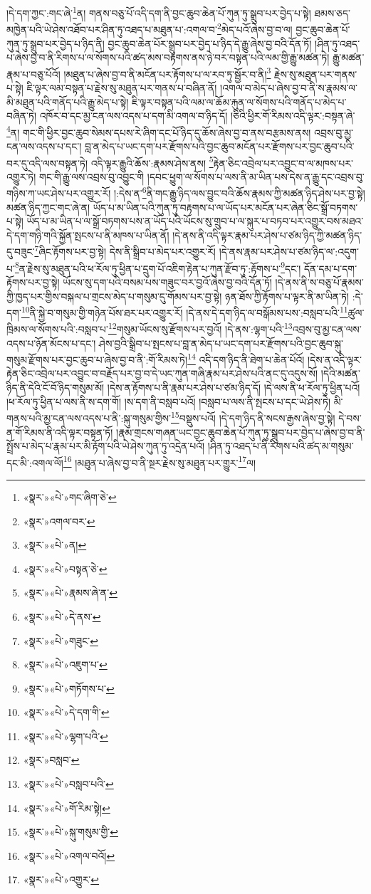 །དེ་དག་ཀྱང་:གང་ཞེ་\footnote{«སྣར་»«པེ་»གང་ཞིག་ཅེ་}ན། གནས་བཅུ་པོ་འདི་དག་ནི་བྱང་ཆུབ་ཆེན་པོ་ཀུན་ཏུ་སྒྲུབ་པར་བྱེད་པ་སྟེ། ཐམས་ཅད་མཁྱེན་པའི་ཡེ་ཤེས་འཐོབ་པར་ཤིན་ཏུ་འཐད་པ་མཐུན་པ་:འགལ་བ་\footnote{«སྣར་»འགལ་བར་}མེད་པའོ་ཞེས་བྱ་བ་ལ། བྱང་ཆུབ་ཆེན་པོ་ཀུན་ཏུ་སྒྲུབ་པར་བྱེད་པ་ཉིད་ནི། བྱང་ཆུབ་ཆེན་པོར་སྒྲུབ་པར་བྱེད་པ་ཉིད་དེ་རྒྱུ་ཞེས་བྱ་བའི་དོན་ཏོ། །ཤིན་ཏུ་འཐད་པ་ཞེས་བྱ་བ་ནི་རིགས་པ་ལ་སོགས་པའི་ཚད་མས་བརྟགས་ནས་ཉེ་བར་བསྟན་པའི་ལམ་གྱི་རྒྱུ་མཚན་ཏེ། རྒྱུ་མཚན་རྣམ་པ་བཅུ་པོའོ། །མཐུན་པ་ཞེས་བྱ་བ་ནི་མངོན་པར་རྟོགས་པ་ལ་རབ་ཏུ་སྦྱོར་བ་ནི།\footnote{«སྣར་»«པེ་»ན།} རྗེས་སུ་མཐུན་པར་གནས་པ་སྟེ། ཇི་ལྟར་ལམ་བསྟན་པ་རྗེས་སུ་མཐུན་པར་གནས་པ་བཞིན་ནོ། །འགལ་བ་མེད་པ་ཞེས་བྱ་བ་ནི་ས་རྣམས་ལ་མི་མཐུན་པའི་གནོད་པའི་རྒྱུ་མེད་པ་སྟེ། ཇི་ལྟར་བསྟན་པའི་ལམ་ལ་ཆོམ་རྐུན་ལ་སོགས་པའི་གནོད་པ་མེད་པ་བཞིན་ཏེ། འཁོར་བ་དང་མྱ་ངན་ལས་འདས་པ་དག་མི་འགལ་བ་ཉིད་དོ། །ཅིའི་ཕྱིར་གོ་རིམས་འདི་ལྟར་:བསྟན་ཞེ་\footnote{«སྣར་»«པེ་»བསྟན་ཅེ་}ན། གང་གི་ཕྱིར་བྱང་ཆུབ་སེམས་དཔས་རེ་ཞིག་དང་པོ་ཉིད་དུ་ཆོས་ཞེས་བྱ་བ་ནས་བརྩམས་ནས། འབྲས་བུ་མྱ་ངན་ལས་འདས་པ་དང་། བླ་ན་མེད་པ་ཡང་དག་པར་རྫོགས་པའི་བྱང་ཆུབ་མངོན་པར་རྫོགས་པར་བྱང་ཆུབ་པའི་བར་དུ་འདི་ལས་བསྟན་ཏེ། འདི་ལྟར་རྒྱུའི་ཆོས་:རྣམས་ཤེས་ནས། \footnote{«སྣར་»«པེ་»རྣམས་ཞེ་ན་}རྟེན་ཅིང་འབྲེལ་པར་འབྱུང་བ་ལ་མཁས་པར་འགྱུར་ཏེ། གང་གི་རྒྱུ་ལས་འབྲས་བུ་འབྱུང་གི །དབང་ཕྱུག་ལ་སོགས་པ་ལས་ནི་མ་ཡིན་པས་དེས་ན་རྒྱུ་དང་འབྲས་བུ་གཉིས་ཀ་ཡང་ཤེས་པར་འགྱུར་རོ། །:དེས་ན་\footnote{«སྣར་»«པེ་»དེ་ནས་}ནི་གང་རྒྱུ་ཉིད་ལས་བྱུང་བའི་ཆོས་རྣམས་ཀྱི་མཚན་ཉིད་ཤེས་པར་བྱ་སྟེ། མཚན་ཉིད་ཀྱང་གང་ཞེ་ན། ཡོད་པ་མ་ཡིན་པའི་ཀུན་ཏུ་བརྟགས་པ་ལ་ཡོད་པར་མངོན་པར་ཞེན་ཅིང་སྒྲོ་བཏགས་པ་སྟེ། ཡོད་པ་མ་ཡིན་པ་ལ་སྒྲོ་བཏགས་པས་ན་ཡོད་པའི་ཡོངས་སུ་གྲུབ་པ་ལ་སྐུར་པ་བཏབ་པར་འགྱུར་བས་མཐའ་དེ་དག་གཉི་གའི་སྐྱོན་སྤངས་པ་ནི་མཁས་པ་ཡིན་ནོ། །དེ་ནས་ནི་འདི་ལྟར་རྣམ་པར་ཤེས་པ་ཙམ་ཉིད་ཀྱི་མཚན་ཉིད་དུ་བཟུང་\footnote{«སྣར་»«པེ་»གཟུང་}ཞིང་རྟོགས་པར་བྱ་སྟེ། དེས་ནི་སྒྲིབ་པ་མེད་པར་འགྱུར་རོ། །དེ་ནས་རྣམ་པར་ཤེས་པ་ཙམ་ཉིད་ལ་:འདུག་པ་\footnote{«སྣར་»«པེ་»འཇུག་པ་}ན་རྗེས་སུ་མཐུན་པའི་ཕ་རོལ་ཏུ་ཕྱིན་པ་དྲུག་པོ་འཇིག་རྟེན་པ་ཀུན་རྫོབ་ཏུ་:རྟོགས་པ་\footnote{«སྣར་»«པེ་»གཏོགས་པ་}དང་། དོན་དམ་པ་དག་རྟོགས་པར་བྱ་སྟེ། ཡོངས་སུ་དག་པའི་བསམ་པས་གཟུང་བར་བྱའོ་ཞེས་བྱ་བའི་དོན་ཏོ། །དེ་ནས་ནི་ས་བཅུ་པོ་རྣམས་ཀྱི་ཁྱད་པར་གྱིས་བསྐལ་པ་གྲངས་མེད་པ་གསུམ་དུ་གོམས་པར་བྱ་སྟེ། ཉན་ཐོས་ཀྱི་རྟོགས་པ་ལྟར་ནི་མ་ཡིན་ཏེ། :དེ་དག་\footnote{«སྣར་»«པེ་»དེ་དག་གི་}ནི་སྐྱེ་བ་གསུམ་གྱི་གཉེན་པོས་ཐར་པར་འགྱུར་རོ། །དེ་ནས་དེ་དག་ཉིད་ལ་བསྒོམས་པས་:བསླབ་པའི་\footnote{«སྣར་»«པེ་»ལྷག་པའི་}ཚུལ་ཁྲིམས་ལ་སོགས་པའི་:བསླབ་པ་\footnote{«སྣར་»བསླབ་}གསུམ་ཡོངས་སུ་རྫོགས་པར་བྱའོ། །དེ་ནས་:ལྷག་པའི་\footnote{«སྣར་»«པེ་»བསླབ་པའི་}འབྲས་བུ་མྱ་ངན་ལས་འདས་པ་ཉོན་མོངས་པ་དང་། ཤེས་བྱའི་སྒྲིབ་པ་སྤངས་པ་བླ་ན་མེད་པ་ཡང་དག་པར་རྫོགས་པའི་བྱང་ཆུབ་སྐུ་གསུམ་རྫོགས་པར་བྱང་ཆུབ་པ་ཞེས་བྱ་བ་ནི་:གོ་རིམས་ཏེ།\footnote{«སྣར་»«པེ་»གོ་རིམ་སྟེ།} འདི་དག་ཉིད་ནི་ཐེག་པ་ཆེན་པོའོ། །དེས་ན་འདི་ལྟར་རྟེན་ཅིང་འབྲེལ་པར་འབྱུང་བ་བརྗོད་པར་བྱ་བ་དེ་ཡང་ཀུན་གཞི་རྣམ་པར་ཤེས་པའི་ནང་དུ་འདུས་སོ། །དེའི་མཚན་ཉིད་ནི་དེའི་ངོ་བོ་ཉིད་གསུམ་མོ། །དེས་ན་རྟོགས་པ་ནི་རྣམ་པར་ཤེས་པ་ཙམ་ཉིད་དོ། །དེ་ལས་ནི་ཕ་རོལ་ཏུ་ཕྱིན་པའོ། །ཕ་རོལ་ཏུ་ཕྱིན་པ་ལས་ནི་ས་དག་གོ། །ས་དག་ནི་བསླབ་པའོ། །བསླབ་པ་ལས་ནི་སྤངས་པ་དང་ཡེ་ཤེས་ཏེ། མི་གནས་པའི་མྱ་ངན་ལས་འདས་པ་ནི་:སྐུ་གསུམ་གྱིས་\footnote{«སྣར་»«པེ་»སྐུ་གསུམ་གྱི་}བསྡུས་པའོ། །དེ་དག་ཉིད་ནི་སངས་རྒྱས་ཞེས་བྱ་སྟེ། དེ་བས་ན་གོ་རིམས་ནི་འདི་ལྟར་བསྟན་ཏོ། །རྣམ་གྲངས་གཞན་ཡང་བྱང་ཆུབ་ཆེན་པོ་ཀུན་ཏུ་སྒྲུབ་པར་བྱེད་པ་ཞེས་བྱ་བ་ནི་སྤྲོས་པ་མེད་པ་རྣམ་པར་མི་རྟོག་པའི་ཡེ་ཤེས་ཀུན་ཏུ་འདྲེན་པའོ། །ཤིན་ཏུ་འཐད་པ་ནི་རིགས་པའི་ཚད་མ་གསུམ་དང་མི་:འགལ་ལོ།\footnote{«སྣར་»«པེ་»འགལ་བའོ།} །མཐུན་པ་ཞེས་བྱ་བ་ནི་སྔར་རྗེས་སུ་མཐུན་པར་གྱུར་\footnote{«སྣར་»«པེ་»འགྱུར་}ལ། 